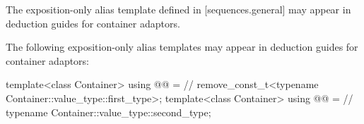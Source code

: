\pnum
The exposition-only alias template  defined in
[sequences.general] may appear in
deduction guides for container adaptors.

\begin{addedblock}
\pnum
The following exposition-only alias templates may appear in deduction guides
for container adaptors:

\begin{codeblock}
  template<class Container>
    using @@ =                                // \expos
      remove_const_t<typename Container::value_type::first_type>;
  template<class Container>
    using @@ =                             // \expos
      typename Container::value_type::second_type;
\end{codeblock}
\end{addedblock}

\noindent\makebox[\linewidth]{\rule{\textwidth}{0.4pt}}

